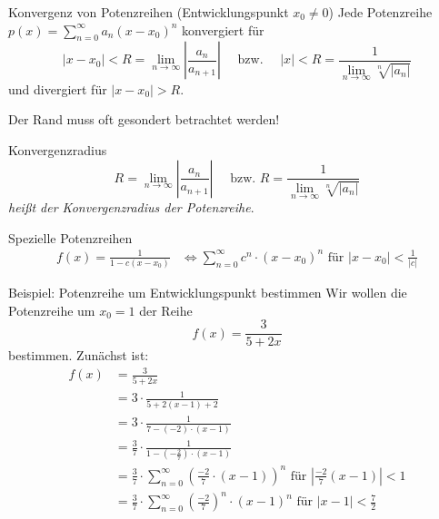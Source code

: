 \documentclass[german]{spicker}
\renewcommand{\abs}[1]{\left| #1 \right|}
\begin{document}
\begin{defi}{Konvergenz von Potenzreihen (Entwicklungspunkt $x_0 \neq 0$)}
    Jede Potenzreihe $p(x) = \sum^\infty_{n=0} a_n (x-x_0)^n$ konvergiert für
    $$
        \abs{x-x_0} < R = \lim_{n\to\infty} \abs{\frac{a_n}{a_{n+1}}}\quad  \text{ bzw. } \quad \abs{x} < R = \frac{1}{\lim_{n\to\infty} \sqrt[n]{\abs{a_n}}}
    $$
    und divergiert für $\abs{x-x_0} > R$.

    Der Rand muss oft gesondert betrachtet werden!
\end{defi}

\begin{defi}{Konvergenzradius}
    $$
        R = \lim_{n\to\infty} \abs{\frac{a_n}{a_{n+1}}}\quad  \text{ bzw. } R = \frac{1}{\lim_{n\to\infty} \sqrt[n]{\abs{a_n}}}
    $$
    \emph{heißt der Konvergenzradius der Potenzreihe}.
\end{defi}

\begin{bonus}{Spezielle Potenzreihen}
    $$
        \begin{aligned}
            f(x) = \frac{1}{1-c(x-x_0)} & \iff \sum^\infty_{n=0} c^n \cdot (x-x_0)^n \text{ für } \abs{x-x_0} < \frac{1}{\abs{c}}
        \end{aligned}
    $$
\end{bonus}

\begin{bonus}{Beispiel: Potenzreihe um Entwicklungspunkt bestimmen}
    Wir wollen die Potenzreihe um $x_0 = 1$ der Reihe $$f(x) = \frac{3}{5+2x}$$ bestimmen.
    Zunächst ist:
    $$
        \begin{aligned}
            f(x) & ={} \frac{3}{5+2x}                                                                                                       \\
                 & ={} 3\cdot \frac{1}{5+2(x-1) + 2}                                                                                        \\
                 & ={} 3\cdot \frac{1}{7- (-2) \cdot (x-1)}                                                                                 \\
                 & ={} \frac{3}{7}\cdot \frac{1}{1- (-\frac{2}{7}) \cdot (x-1)}                                                             \\
                 & ={} \frac{3}{7}\cdot \sum^\infty_{n=0} \left(\frac{-2}{7} \cdot (x-1)\right)^n \text{ für } \abs{\frac{-2}{7} (x-1)} < 1 \\
                 & ={} \frac{3}{7}\cdot \sum^\infty_{n=0} \left(\frac{-2}{7}\right)^n \cdot (x-1)^n \text{ für } \abs{x-1} < \frac{7}{2}
        \end{aligned}
    $$
\end{bonus}
\end{document}
